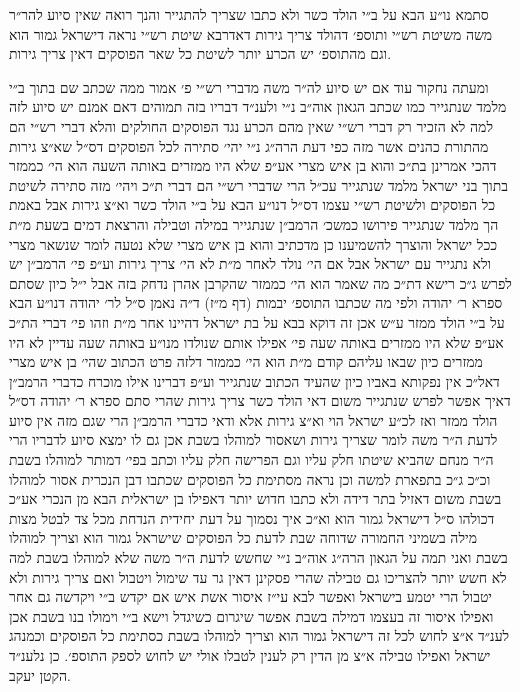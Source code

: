 \documentclass[12pt, openany]{book}
\begin{document}
\begin{multicols}{2}
סתמא נו״ע הבא על ב״י הולד כשר ולא כתבו שצריך להתגייר והנך רואה שאין סיוע להר״ר משה משיטת רש״י ותוספ׳ דהולד צריך גירות דאדרבא שיטת רש״י נראה דישראל גמור הוא וגם מהתוספ׳ יש הכרע יותר לשיטת כל שאר הפוסקים דאין צריך גירות.\\\vspace{0pt}

ומעתה נחקור עוד אם יש סיוע לה״ר משה מדברי רש״י פ׳ אמור ממה שכתב שם בתוך ב״י מלמד שנתגייר כמו שכתב הגאון אוה״ב נ״י ולענ״ד דבריו בזה תמוהים דאם אמנם יש סיוע לזה למה לא הזכיר רק דברי רש״י שאין מהם הכרע נגד הפוסקים החולקים והלא דברי רש״י הם מהתורת כהנים אשר מזה כפי דעת הרה״ג נ״י יהי׳ סתירה לכל הפוסקים דס״ל שא״צ גירות דהכי אמרינן בת״כ והוא בן איש מצרי אע״פ שלא היו ממזרים באותה השעה הוא הי׳ כממזר בתוך בני ישראל מלמד שנתגייר עכ״ל הרי שדברי רש״י הם דברי ת״כ ויהי׳ מזה סתירה לשיטת כל הפוסקים ולשיטת רש״י עצמו דס״ל דנו״ע הבא על ב״י הולד כשר וא״צ גירות אבל באמת הך מלמד שנתגייר פירושו כמשכ׳ הרמב״ן שנתגייר במילה וטבילה והרצאת דמים בשעת מ״ת ככל ישראל והוצרך להשמיענו כן מדכתיב והוא בן איש מצרי שלא נטעה לומר שנשאר מצרי ולא נתגייר עם ישראל אבל אם הי׳ נולד לאחר מ״ת לא הי׳ צריך גירות וע״פ פי׳ הרמב״ן יש לפרש ג״כ רישא דת״כ מה שאמר הוא הי׳ כממזר שהקרבן אהרן נדחק בזה אבל י״ל כיון שסתם ספרא ר׳ יהודה ולפי מה שכתבו התוספ׳ יבמות (דף מ״ז) ד״ה נאמן ס״ל לר׳ יהודה דנו״ע הבא על ב״י הולד ממזר ע״ש אכן זה דוקא בבא על בת ישראל דהיינו אחר מ״ת וזהו פי׳ דברי הת״כ אע״פ שלא היו ממזרים באותה שעה פי׳ אפילו אותם שנולדו מנו״ע באותה שעה עדיין לא היו ממזרים כיון שבאו עליהם קודם מ״ת הוא הי׳ כממזר דלזה פרט הכתוב שהי׳ בן איש מצרי דאל״כ אין נפקותא באביו כיון שהעיד הכתוב שנתגייר וע״פ דברינו אילו מוכרח כדברי הרמב״ן דאיך אפשר לפרש שנתגייר משום דאי הולד כשר צריך גירות שהרי סתם ספרא ר׳ יהודה דס״ל הולד ממזר ואז לכ״ע ישראל הוי וא״צ גירות אלא ודאי כדברי הרמב״ן הרי שגם מזה אין סיוע לדעת ה״ר משה לומר שצריך גירות ושאסור למוהלו בשבת אכן גם לו ימצא סיוע לדבריו הרי ה״ר מנחם שהביא שיטתו חלק עליו וגם הפרישה חלק עליו וכתב בפי׳ דמותר למוהלו בשבת וכ״כ ג״כ בתפארת למשה וכן נראה מסתימת כל הפוסקים שכתבו דבן הנכרית אסור למוהלו בשבת משום דאזיל בתר דידה ולא כתבו חדוש יותר דאפילו בן ישראלית הבא מן הנכרי אע״כ דכולהו ס״ל דישראל גמור הוא וא״כ איך נסמוך על דעת יחידית הנדחת מכל צד לבטל מצות מילה בשמיני החמורה שדוחה שבת לדעת כל הפוסקים שישראל גמור הוא וצריך למוהלו בשבת ואני תמה על הגאון הרה״ג אוה״ב נ״י שחשש לדעת ה״ר משה שלא למוהלו בשבת למה לא חשש יותר להצריכו גם טבילה שהרי פסקינן דאין גר עד שימול ויטבול ואם צריך גירות ולא יטבול הרי יטמע בישראל ואפשר לבא עי״ז איסור אשת איש אם יקדש ב״י ויקדשה גם אחר ואפילו איסור זה בעצמו דמילה בשבת אפשר שיגרום כשיגדל וישא ב״י וימולו בנו בשבת אכן לענ״ד א״צ לחוש לכל זה דישראל גמור הוא וצריך למוהלו בשבת כסתימת כל הפוסקים וכמנהג ישראל ואפילו טבילה א״צ מן הדין רק לענין לטבלו אולי יש לחוש לספק התוספ׳. כן נלענ״ד הקטן יעקב.\\\vspace{0pt}

\end{multicols}\newpage
\end{document}
